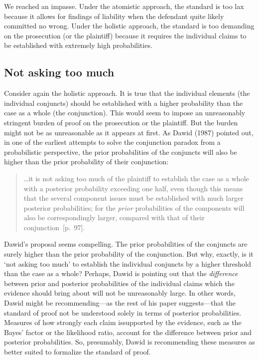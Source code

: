 \documentclass[
  10pt,
  dvipsnames,enabledeprecatedfontcommands]{scrartcl}
\begin{document}
We reached an impasse. Under the atomistic approach, the standard is too
lax because it allows for findings of liability when the defendant quite
likely committed no wrong. Under the holistic approach, the standard is
too demanding on the prosecution (or the plaintiff) because it requires
the individual claims to be established with extremely high
probabilities.

\hypertarget{not-asking-too-much}{%
\subsection{Not asking too much}\label{not-asking-too-much}}

Consider again the holistic approach. It is true that the individual
elements (the individual conjuncts) should be established with a higher
probability than the case as a whole (the conjunction). This would seem
to impose an unreasonably stringent burden of proof on the prosecution
or the plaintiff. But the burden might not be as unreasonable as it
appears at first. As Dawid (1987) pointed out, in one of the earliest
attempts to solve the conjunction paradox from a probabilistic
perspective, the prior probabilities of the conjuncts will also be
higher than the prior probability of their conjunction:

\begin{quote}
\dots it is not asking too much of the plaintiff to establish the case as a whole with a posterior probability exceeding one half, even though this means  that the several component issues must be established with much larger posterior probabilities; for the \textit{prior}  probabilities of the components will also be correspondingly larger, compared with that of their conjunction~[p.~97].
 \end{quote}

Dawid's proposal seems compelling. The prior probabilities of the
conjuncts are surely higher than the prior probability of the
conjunction. But why, exactly, is it `not asking too much' to establish
the individual conjuncts by a higher threshold than the case as a whole?
Perhaps, Dawid is pointing out that the \textit{difference} between
prior and posterior probabilities of the individual claims which the
evidence should bring about will not be unreasonably large. In other
words, Dawid might be recommending---as the rest of his paper
suggests---that the standard of proof not be understood solely in terms
of posterior probabilities. Measures of how strongly each claim
issupported by the evidence, such as the Bayes' factor or the likelihood
ratio, account for the difference between prior and posterior
probabilities. So, presumably, Dawid is recommending these measures as
better suited to formalize the standard of proof.
\end{document}
